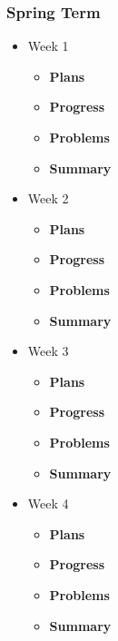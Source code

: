 	\subsubsection{Spring Term}
	\begin{itemize}
		\item{Week 1}
			\begin{itemize}
				\item \textbf{Plans} \\
				\item \textbf{Progress} \\
				\item \textbf{Problems} \\
				\item \textbf{Summary} \\
			\end{itemize}

		\item{Week 2}
			\begin{itemize}
				\item \textbf{Plans} \\
				\item \textbf{Progress} \\
				\item \textbf{Problems} \\
				\item \textbf{Summary} \\
			\end{itemize}

		\item{Week 3}
			\begin{itemize}
				\item \textbf{Plans} \\
				\item \textbf{Progress} \\
				\item \textbf{Problems} \\
				\item \textbf{Summary} \\
			\end{itemize}

		\item{Week 4}
			\begin{itemize}
				\item \textbf{Plans} \\
				\item \textbf{Progress} \\
				\item \textbf{Problems} \\
				\item \textbf{Summary} \\
			\end{itemize}


\end{itemize}
